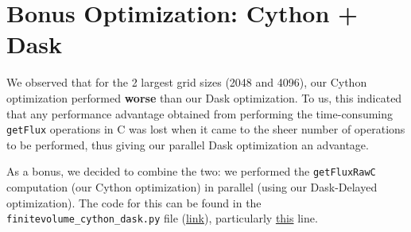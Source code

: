 \documentclass[a4paper,10pt]{article}
\begin{document}
\section{Bonus Optimization: Cython + Dask}
We observed that for the 2 largest grid sizes (2048 and 4096), our Cython optimization performed \textbf{worse} than our Dask optimization. To us, this indicated that any performance advantage obtained from performing the time-consuming \verb|getFlux| operations in C was lost when it came to the sheer number of operations to be performed, thus giving our parallel Dask optimization an advantage. 

As a bonus, we decided to combine the two: we performed the \verb|getFluxRawC| computation (our Cython optimization) in parallel (using our Dask-Delayed optimization). The code for this can be found in the \verb|finitevolume_cython_dask.py| file (\href{https://github.com/paulmyr/DD2358-HPC25/blob/master/10_project_rishi_paul/code/cython/finitevolume_cython_dask.py}{link}), particularly \href{https://github.com/paulmyr/DD2358-HPC25/blob/master/10_project_rishi_paul/code/cython/finitevolume_cython_dask.py#L305}{this} line. 
\end{document}
